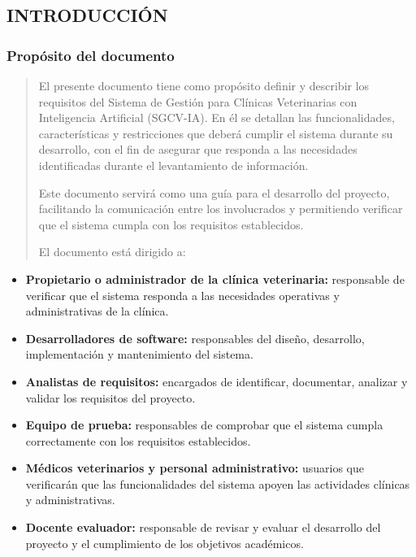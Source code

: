 \documentclass[
]{article}
\begin{document}
\subsection{INTRODUCCIÓN}\label{introducciuxf3n}

\subsubsection{Propósito del
documento}\label{propuxf3sito-del-documento}

\begin{quote}
El presente documento tiene como propósito definir y describir los
requisitos del Sistema de Gestión para Clínicas Veterinarias con
Inteligencia Artificial (SGCV-IA). En él se detallan las
funcionalidades, características y restricciones que deberá cumplir el
sistema durante su desarrollo, con el fin de asegurar que responda a las
necesidades identificadas durante el levantamiento de información.

Este documento servirá como una guía para el desarrollo del proyecto,
facilitando la comunicación entre los involucrados y permitiendo
verificar que el sistema cumpla con los requisitos establecidos.

El documento está dirigido a:
\end{quote}

\begin{itemize}
\item
  \textbf{Propietario o administrador de la clínica veterinaria:}
  responsable de verificar que el sistema responda a las necesidades
  operativas y administrativas de la clínica.
\item
  \textbf{Desarrolladores de software:} responsables del diseño,
  desarrollo, implementación y mantenimiento del sistema.
\item
  \textbf{Analistas de requisitos:} encargados de identificar,
  documentar, analizar y validar los requisitos del proyecto.
\item
  \textbf{Equipo de prueba:} responsables de comprobar que el sistema
  cumpla correctamente con los requisitos establecidos.
\item
  \textbf{Médicos veterinarios y personal administrativo:} usuarios que
  verificarán que las funcionalidades del sistema apoyen las actividades
  clínicas y administrativas.
\item
  \textbf{Docente evaluador:} responsable de revisar y evaluar el
  desarrollo del proyecto y el cumplimiento de los objetivos académicos.
\end{itemize}
\end{document}
